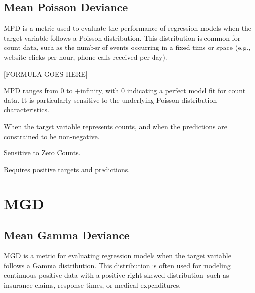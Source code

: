 \subsection{Mean Poisson Deviance}

MPD is a metric used to evaluate the performance of regression models when the target variable follows a Poisson distribution. This distribution is common for count data, such as the number
of events occurring in a fixed time or space (e.g., website clicks per hour, phone calls received per day).

\begin{center}
    [FORMULA GOES HERE]
\end{center}

MPD ranges from 0 to +infinity, with 0 indicating a perfect model fit for count data. It is particularly sensitive to the underlying Poisson distribution characteristics.


When the target variable represents counts, and when the predictions are constrained to be non-negative.

{
    \item Sensitive to Zero Counts.
    \item Requires positive targets and predictions.
}

\clearpage
\thispagestyle{regressionstyle}
\section{MGD}
\subsection{Mean Gamma Deviance}

MGD is a metric for evaluating regression models when the target variable follows a Gamma distribution. This distribution is often used for modeling continuous positive data with a
positive right-skewed distribution, such as insurance claims, response times, or medical expenditures.


